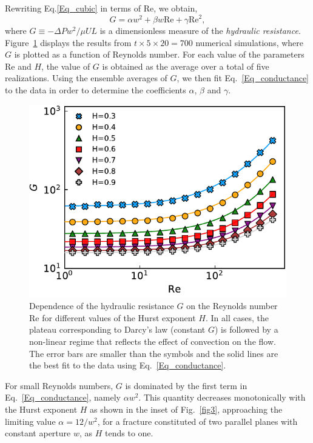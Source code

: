 \documentclass[aps,pre,
superscriptaddress,
twocolumn,
notitlepage,
10pt,
]{revtex4-1}
\begin{document}
Rewriting Eq.\eqref{Eq_cubic} in terms of $\mathrm{Re}$, we obtain,
%
\begin{equation} 
G = \alpha w^2 + \beta w \mathrm{Re} + \gamma \mathrm{Re}^{2},
\label{Eq_conductance} 
\end{equation} 
%
where $G \equiv -\Delta P w^{2}/ \mu U L$ is a dimensionless measure of the
{\it hydraulic resistance}. Figure~\ref{fig2} displays the results from
$t\times5\times20=700$ numerical simulations, where $G$ is plotted as a function
of Reynolds number. For each value of the parameters $\mathrm{Re}$ and $H$,
the value of $G$ is obtained as the average over a total of five
realizations. Using the ensemble averages of $G$, we then fit
Eq.~\eqref{Eq_conductance} to the data in order to determine the
coefficients  $\alpha$, $\beta$ and $\gamma$.  

\begin{figure}[!h] 
	\centering 
	\includegraphics[width=0.99\columnwidth]{fig2.pdf} %
	\caption{ Dependence of the hydraulic resistance $G$ on the Reynolds number
		$\mathrm{Re}$ for different values of the Hurst exponent $H$. In all cases,
		the
		plateau corresponding to Darcy's law (constant $G$) is followed by a
		non-linear
		regime that reflects the effect of convection on the flow. The error bars are
		smaller than the symbols and the solid lines are the best fit to the data
		using
		Eq.~\eqref{Eq_conductance}.} \label{fig2} \end{figure}

For small Reynolds numbers, $G$ is dominated by the first term in
Eq.~\ref{Eq_conductance}, namely $\alpha w^2$. This quantity decreases
monotonically with the Hurst exponent $H$ as shown in the inset of
Fig.~\ref{fig3}, approaching the limiting value $\alpha = 12/w^2$, for a
fracture constituted  of two parallel planes with constant aperture $w$, as
$H$ tends to one.
\end{document}
